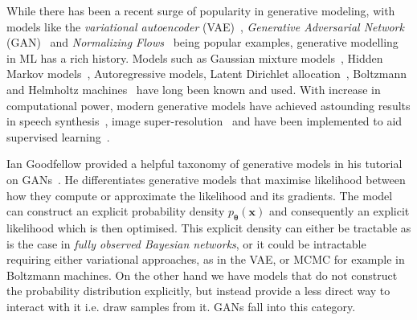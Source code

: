 While there has been a recent surge of popularity in generative modeling, with models like the \emph{variational autoencoder} (VAE)~\cite{kingma2013auto, rezende2014stochastic}, \emph{Generative Adversarial Network} (GAN)~\cite{goodfellow2016nips} and \emph{Normalizing Flows}~\cite{rezende2015variational} being popular examples, generative modelling in ML has a rich history. Models such as Gaussian mixture models~\cite{everitt2014finite}, Hidden Markov models~\cite{rabiner1986introduction}, Autoregressive models, Latent Dirichlet allocation~\cite{blei2003latent}, Boltzmann and Helmholtz machines~\cite{ackley1985learning, dayan1995helmholtz} have long been known and used. With increase in computational power, modern generative models have achieved astounding results in speech synthesis~\cite{oord2016wavenet}, image super-resolution~\cite{ledig2017photo} and have been implemented to aid supervised learning~\cite{kingma2014semi}. 

Ian Goodfellow provided a helpful taxonomy of generative models in his tutorial on GANs~\cite{goodfellow2016nips}. He differentiates generative models that maximise likelihood between how they compute or approximate the likelihood and its gradients. The model can construct an explicit probability density $p_{\boldsymbol{\theta}}(\mathbf{x})$ and consequently an explicit likelihood which is then optimised. This explicit density can either be tractable as is the case in \emph{fully observed Bayesian networks}, or it could be intractable requiring either variational approaches, as in the VAE, or MCMC for example in Boltzmann machines. On the other hand we have models that do not construct the probability distribution explicitly, but instead provide a less direct way to interact with it i.e. draw samples from it. GANs fall into this category. 

